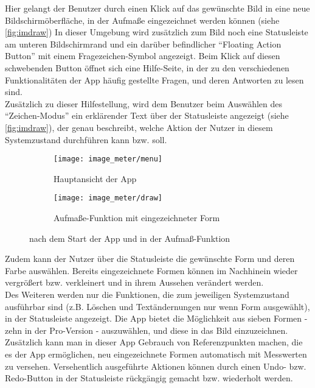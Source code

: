Hier gelangt der Benutzer durch einen Klick auf das gewünschte Bild in eine neue Bildschirmöberfläche, in der Aufmaße eingezeichnet werden können (siehe \autoref{fig:imdraw})
In dieser Umgebung wird zusätzlich zum Bild noch eine Statusleiste am unteren Bildschirmrand und ein darüber befindlicher ``Floating Action Button''  mit einem Fragezeichen-Symbol angezeigt.
Beim Klick auf diesen schwebenden Button öffnet sich eine Hilfe-Seite, in der zu den verschiedenen Funktionalitäten der App häufig gestellte Fragen, und deren Antworten zu lesen sind. \\

Zusätzlich zu dieser Hilfestellung, wird dem Benutzer beim Auswählen des ``Zeichen-Modus'' ein erklärender Text über der Statusleiste angezeigt (siehe \autoref{fig:imdraw}), der genau beschreibt, welche Aktion der Nutzer in diesem Systemzustand durchführen kann bzw. soll. \\

\begin{figure}[h]
  \centering
  \begin{subfigure}[t]{0.4\textwidth}
    \texttt{[image: image\_meter/menu]}
    \caption{Hauptansicht der App}
    \label{fig:immenu}	
  \end{subfigure}
  \begin{subfigure}[t]{0.4\textwidth}
    \texttt{[image: image\_meter/draw]}
    \caption{Aufmaße-Funktion mit eingezeichneter Form} 
    \label{fig:imdraw}	
  \end{subfigure}
  \caption{\im{} nach dem Start der App und in der Aufmaß-Funktion}
\end{figure}

\noindent
Zudem kann der Nutzer über die Statusleiste die gewünschte Form und deren Farbe auswählen.
Bereits eingezeichnete Formen können im Nachhinein wieder vergrößert bzw. verkleinert und in ihrem Aussehen verändert werden. \\

Des Weiteren werden nur die Funktionen, die zum jeweiligen Systemzustand ausführbar sind (z.B. Löschen und Textändernungen nur wenn Form ausgewählt), in der Statusleiste angezeigt.
Die App bietet die Möglichkeit aus sieben Formen - zehn in der Pro-Version - auszuwählen, und diese in das Bild einzuzeichnen.
Zusätzlich kann man in dieser App Gebrauch von Referenzpunkten machen, die es der App ermöglichen, neu eingezeichnete Formen automatisch mit Messwerten zu versehen.
Versehentlich ausgeführte Aktionen können durch einen Undo- bzw. Redo-Button in der Statusleiste rückgängig gemacht bzw. wiederholt werden. \\

